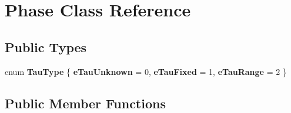 \hypertarget{class_phase}{\section{Phase Class Reference}
\label{class_phase}
}
\subsection*{Public Types}
\begin{DoxyCompactItemize}
\item 
enum {\bfseries Tau\-Type} \{ {\bfseries e\-Tau\-Unknown} = 0, 
{\bfseries e\-Tau\-Fixed} = 1, 
{\bfseries e\-Tau\-Range} = 2
 \}
\end{DoxyCompactItemize}
\subsection*{Public Member Functions}

